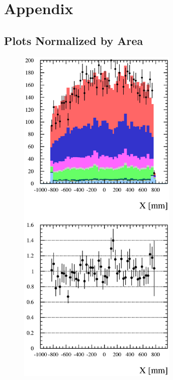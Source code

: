 \section*{Appendix}
\label{sec:Appendix}

\subsection{Plots Normalized by Area}
\label{sec:Appendix_OtherPlots}

\begin{figure}[h]
  \centering
  \includegraphics[width=3in]{Figures/P0DTrkXRun1Run2-normByRatio.eps}

\end{figure}
